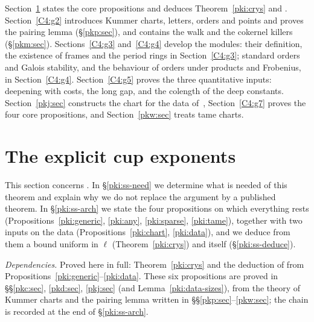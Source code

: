 \documentclass[10pt]{amsart}
\theoremstyle{definition}
\theoremstyle{remark}
\newcommand{\Q}{\mathbb Q}
\begin{document}
Section~\ref{pki:sec} states the core propositions and deduces Theorem~\ref{pki:crys} and
{\cite[Theorem~5.8]{P55}}. Section~\ref{C4:g2} introduces Kummer charts, letters, orders and
points and proves the pairing lemma (\S\ref{pkp:sec}), and contains the walk and the cokernel
killers (\S\ref{pkm:sec}). Sections~\ref{C4:g3} and~\ref{C4:g4} develop the modules: their
definition, the existence of frames and the period rings in Section~\ref{C4:g3}; standard orders
and Galois stability, and the behaviour of orders under products and Frobenius, in
Section~\ref{C4:g4}. Section~\ref{C4:g5} proves the three quantitative inputs: deepening with
costs, the long gap, and the colength of the deep constants. Section~\ref{pkj:sec} constructs the
chart for the data of~\cite{P46}, Section~\ref{C4:g7} proves the four core propositions, and
Section~\ref{pkw:sec} treats tame charts.


\providecommand{\auO}{\mathcal O}
\providecommand{\auQlb}{\overline{\Q}_\ell}
\providecommand{\pglen}{\operatorname{len}}
\providecommand{\pllZf}{Z_f}
\providecommand{\pllrk}{\operatorname{rk}}
\providecommand{\plldef}{\delta^{\vee}}
\providecommand{\pkiWin}{\operatorname{Win}}
\providecommand{\pkiC}{\mathcal C}
\providecommand{\pkilog}{\operatorname{lg}}

\section{The explicit cup exponents}\label{pki:sec}

This section concerns {\cite[Theorem~5.8]{P55}}. In \S\ref{pki:ss-need} we determine what is needed of this theorem and explain why we do not replace the argument by a published theorem. In
\S\ref{pki:ss-arch} we state the four propositions on which everything rests
(Propositions~\ref{pki:generic}, \ref{pki:any}, \ref{pki:sparse}, \ref{pki:tame}), together with two
inputs on the data (Propositions~\ref{pki:chart}, \ref{pki:data}), and we deduce from them a bound
uniform in $\ell$ (Theorem~\ref{pki:crys}) and {\cite[Theorem~5.8]{P55}} itself
(\S\ref{pki:ss-deduce}).

\emph{Dependencies.} Proved here in full: Theorem~\ref{pki:crys} and the deduction of
{\cite[Theorem~5.8]{P55}} from Propositions~\ref{pki:generic}--\ref{pki:data}. These six
propositions are proved in \S\S\ref{pkc:sec}, \ref{pkd:sec}, \ref{pkj:sec} (and Lemma~\ref{pki:data-sizes}), from the theory of Kummer
charts and the pairing lemma written in \S\S\ref{pkp:sec}--\ref{pkw:sec}; the chain is recorded at the
end of \S\ref{pki:ss-arch}.
\end{document}
